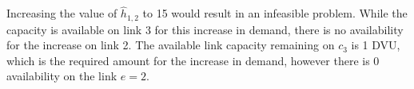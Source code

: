 Increasing the value of $\hat{h}_{1,2}$ to 15 would result in an infeasible
problem. While the capacity is available on link 3 for this increase in demand,
there is no availability for the increase on link 2. The available link capacity
remaining on $c_3$ is 1 DVU, which is the required amount for the increase in
demand, however there is 0 availability on the link $e=2$.
